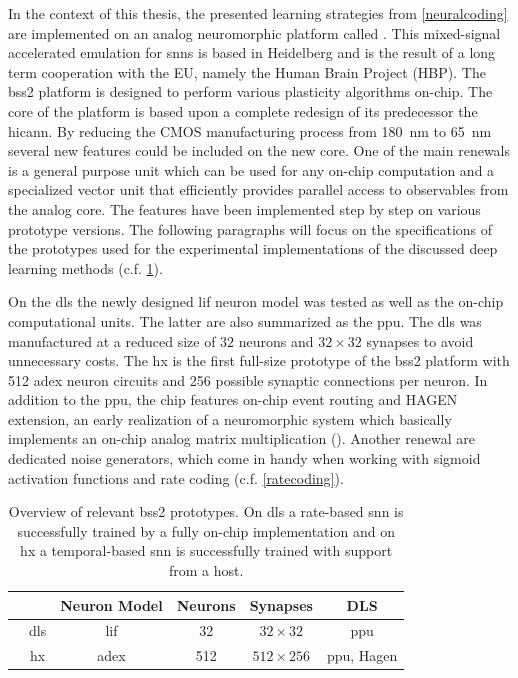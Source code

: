 In the context of this thesis, the presented learning strategies from \cref{neuralcoding} are implemented on an analog neuromorphic platform called . This mixed-signal accelerated emulation for \glspl{snn} is based in Heidelberg and is the result of a long term cooperation with the EU, namely the Human Brain Project (HBP).
%
The \gls{bss2} platform is designed to perform various plasticity algorithms on-chip. The core of the platform is based upon a complete redesign of its predecessor the \gls{hicann}. By reducing the CMOS manufacturing process from \SI{180}{\nano \m} to \SI{65}{\nano \m} several new features could be included on the new core. One of the main renewals is a general purpose unit which can be used for any on-chip computation and a specialized vector unit that efficiently provides parallel access to observables from the analog core. The features have been implemented step by step on various prototype versions. The following paragraphs will focus on the specifications of the prototypes used for the experimental implementations of the discussed deep learning methods (c.f. \cref{bss2prototypes}).

On the \gls{dls} the newly designed \gls{lif} neuron model was tested as well as the on-chip computational units. The latter are also summarized as the \gls{ppu}. The \gls{dls} was manufactured at a reduced size of $32$ neurons and $32 \times 32$ synapses to avoid unnecessary costs. The \gls{hx} is the first full-size prototype of the \gls{bss2} platform with 512 \gls{adex} neuron circuits and 256 possible synaptic connections per neuron. In addition to the \gls{ppu}, the chip features on-chip event routing and HAGEN extension, an early realization of a neuromorphic system which basically implements an on-chip analog matrix multiplication (\citealp{schemmel2020accelerated}). Another renewal are dedicated noise generators, which come in handy when working with sigmoid activation functions and rate coding (c.f. \cref{ratecoding}).

\begin{table}[t!]\centering{}
	\begin{tabular}{@{}rccccc@{}}\toprule
		& 					& Neuron Model	& Neurons 	& Synapses 	& DLS	\\ \midrule
		& \acrshort{dls}	& \gls{lif}		& 32 		& $32 \times 32$	& \gls{ppu}\\
		& \acrshort{hx}		& \gls{adex}	& 512	 	& $512 \times 256$	& \gls{ppu}, Hagen\\
		\bottomrule
	\end{tabular}
	\caption[Overview of relevant \gls{bss2} prototypes.]{Overview of relevant \gls{bss2} prototypes. On \acrshort{dls} a rate-based \gls{snn} is successfully trained by a fully on-chip implementation and on \acrshort{hx} a temporal-based \gls{snn} is successfully trained with support from a host.}
	\label{bss2prototypes}
\end{table}

